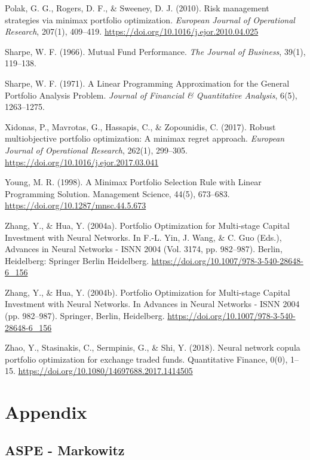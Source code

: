 \documentclass[12pt]{article} %
\begin{document}
\begin{hangparas}{.25in}{1}
Polak, G. G., Rogers, D. F., \& Sweeney, D. J. (2010). Risk management strategies via minimax portfolio optimization.\emph{ European Journal of Operational Research}, 207(1), 409–419. \url{https://doi.org/10.1016/j.ejor.2010.04.025} 

Sharpe, W. F. (1966). Mutual Fund Performance. \emph{The Journal of Business}, 39(1), 119–138.

Sharpe, W. F. (1971). A Linear Programming Approximation for the General Portfolio Analysis Problem. \emph{Journal of Financial \& Quantitative Analysis}, 6(5), 1263–1275.

Xidonas, P., Mavrotas, G., Hassapis, C., \& Zopounidis, C. (2017). Robust multiobjective portfolio optimization: A minimax regret approach. \emph{European Journal of Operational Research}, 262(1), 299–305. \url{https://doi.org/10.1016/j.ejor.2017.03.041}

Young, M. R. (1998). A Minimax Portfolio Selection Rule with Linear Programming Solution. Management Science, 44(5), 673–683. \url{https://doi.org/10.1287/mnsc.44.5.673}

Zhang, Y., \& Hua, Y. (2004a). Portfolio Optimization for Multi-stage Capital Investment with Neural Networks. In F.-L. Yin, J. Wang, \& C. Guo (Eds.), Advances in Neural Networks - ISNN 2004 (Vol. 3174, pp. 982–987). Berlin, Heidelberg: Springer Berlin Heidelberg. \url{https://doi.org/10.1007/978-3-540-28648-6_156}

Zhang, Y., \& Hua, Y. (2004b). Portfolio Optimization for Multi-stage Capital Investment with Neural Networks. In Advances in Neural Networks - ISNN 2004 (pp. 982–987). Springer, Berlin, Heidelberg. \url{https://doi.org/10.1007/978-3-540-28648-6_156}

Zhao, Y., Stasinakis, C., Sermpinis, G., \& Shi, Y. (2018). Neural network copula portfolio optimization for exchange traded funds. Quantitative Finance, 0(0), 1–15. \url{https://doi.org/10.1080/14697688.2017.1414505}

\end{hangparas}


\section*{Appendix}

\subsection*{ASPE - Markowitz}
\end{document}
